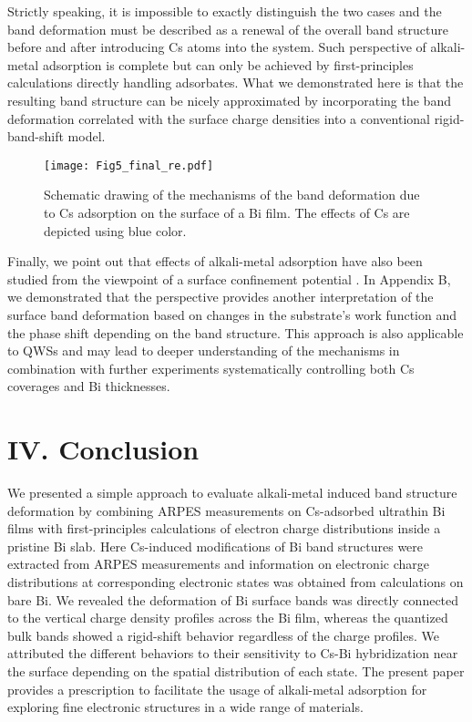 \documentclass[reprint,secnumarabic,amssymb, nobibnotes, aps, prl,superscriptaddress,showpacs]{revtex4-1}
\begin{document}
Strictly speaking, it is impossible to exactly distinguish the two cases and the band deformation must be described as a renewal of the overall band structure before and after introducing Cs atoms into the system. Such perspective of alkali-metal adsorption is complete but can only be achieved by first-principles calculations directly handling adsorbates. What we demonstrated here is that the resulting band structure can be nicely approximated by incorporating the band deformation correlated with the surface charge densities into a conventional rigid-band-shift model.

\begin{figure}
\texttt{[image: Fig5\_final\_re.pdf]}
\caption{\label{fig5}Schematic drawing of the mechanisms of the band deformation due to Cs adsorption on the surface of a Bi film. The effects of Cs are depicted using blue color.} 	
\end{figure}

Finally, we point out that effects of alkali-metal adsorption have also been studied from the viewpoint of a surface confinement potential \cite{kiejna1981,aruga1989,stampfl1994, diehl1997}. In Appendix B, we demonstrated that the perspective provides another interpretation of the surface band deformation based on changes in the substrate's work function and the phase shift depending on the band structure. This approach is also applicable to QWSs and may lead to deeper understanding of the mechanisms in combination with further experiments systematically controlling both Cs coverages and Bi thicknesses.

\section{IV. Conclusion}
We presented a simple approach to evaluate alkali-metal induced band structure deformation by combining ARPES measurements on Cs-adsorbed ultrathin Bi films with first-principles calculations of electron charge distributions inside a pristine Bi slab. Here Cs-induced modifications of Bi band structures were extracted from ARPES measurements and information on electronic charge distributions at corresponding electronic states was obtained from calculations on bare Bi. We revealed the deformation of Bi surface bands was directly connected to the vertical charge density profiles across the Bi film, whereas the quantized bulk bands showed a rigid-shift behavior regardless of the charge profiles. We attributed the different behaviors to their sensitivity to Cs-Bi hybridization near the surface depending on the spatial distribution of each state. The present paper provides a prescription to facilitate the usage of alkali-metal adsorption for exploring fine electronic structures in a wide range of materials.
\end{document}
